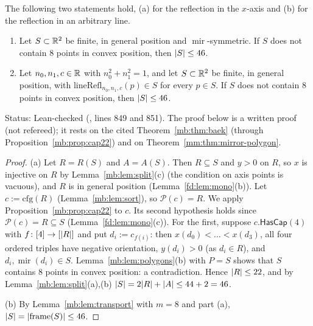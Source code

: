 \begin{theorem}\label{mb:thm:eight}
The following two statements hold, (a) for the reflection in the $x$-axis and (b) for the reflection in an arbitrary
line.
\begin{enumerate}[label=(\alph*)]
\item Let $S\subset\mathbb R^2$ be finite, in general position and $\operatorname{mir}$-symmetric. If $S$ does not contain $8$
  points in convex position, then $\lvert S\rvert\le46$.
\item Let $n_0,n_1,c\in\mathbb R$ with $n_0^2+n_1^2=1$, and let $S\subset\mathbb R^2$ be finite, in general position, with
  $\mathrm{lineRefl}_{n_0,n_1,c}(p)\in S$ for every $p\in S$. If $S$ does not contain $8$ points in convex position, then
  $\lvert S\rvert\le46$.
\end{enumerate}
\end{theorem}

Status: Lean-checked (, lines 849 and 851). The proof below is a written proof (not
refereed); it rests on the cited Theorem~\ref{mb:thm:baek} (through Proposition~\ref{mb:prop:cap22}) and on
Theorem~\ref{mm:thm:mirror-polygon}.

\begin{proof}
(a) Let $R=R(S)$ and $A=A(S)$. Then $R\subseteq S$ and $y>0$ on $R$, so $x$ is injective on $R$ by
Lemma~\ref{mb:lem:split}(c) (the condition on axis points is vacuous), and $R$ is in general position
(Lemma~\ref{fd:lem:mono}(b)). Let $c:=\mathrm{cfg}(R)$ (Lemma~\ref{mb:lem:sort}), so $\mathcal P(c)=R$. We apply
Proposition~\ref{mb:prop:cap22} to $c$. Its second hypothesis holds since $\mathcal P(c)=R\subseteq S$
(Lemma~\ref{fd:lem:mono}(c)). For the first, suppose $c.\mathsf{HasCap}(4)$ with $f\colon[4]\to[\lvert R\rvert]$ and put
$d_i:=c_{f(i)}$: then $x(d_0)<\dots<x(d_3)$, all four ordered triples have negative orientation, $y(d_i)>0$ (as
$d_i\in R$), and $d_i,\operatorname{mir}(d_i)\in S$. Lemma~\ref{mb:lem:polygons}(b) with $P=S$ shows that $S$ contains $8$
points in convex position: a contradiction. Hence $\lvert R\rvert\le22$, and by Lemma~\ref{mb:lem:split}(a),(b)
$\lvert S\rvert=2\lvert R\rvert+\lvert A\rvert\le44+2=46$.

(b) By Lemma~\ref{mb:lem:transport} with $m=8$ and part (a), $\lvert S\rvert=\lvert\mathrm{frame}(S)\rvert\le46$.
\end{proof}


